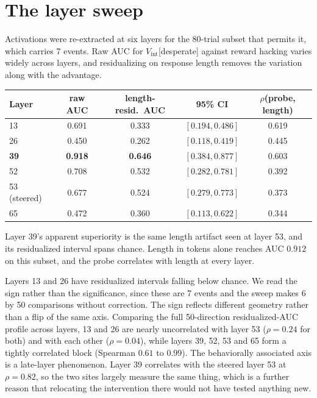 \section{The layer sweep}
\label{app:layers}

Activations were re-extracted at six layers for the 80-trial subset that permits it,
which carries 7 events. Raw AUC for $V_{\text{int}}$[desperate] against reward
hacking varies widely across layers, and residualizing on response length removes
the variation along with the advantage.

{\centering\footnotesize
\begin{tabular}{@{}lcccc@{}}
\toprule
Layer & raw AUC & length-resid.\ AUC & 95\% CI & $\rho$(probe, length) \\
\midrule
13 & 0.691 & 0.333 & $[0.194, 0.486]$ & 0.619 \\
26 & 0.450 & 0.262 & $[0.118, 0.419]$ & 0.445 \\
\textbf{39} & \textbf{0.918} & \textbf{0.646} & $\mathbf{[0.384, 0.877]}$ & 0.603 \\
52 & 0.708 & 0.532 & $[0.282, 0.781]$ & 0.392 \\
53 (steered) & 0.677 & 0.524 & $[0.279, 0.773]$ & 0.373 \\
65 & 0.472 & 0.360 & $[0.113, 0.622]$ & 0.344 \\
\bottomrule
\end{tabular}\par}

\vspace{4pt}
Layer 39's apparent superiority is the same length artifact seen at layer 53, and
its residualized interval spans chance. Length in tokens alone reaches AUC $0.912$
on this subset, and the probe correlates with length at every layer.

Layers 13 and 26 have residualized intervals falling below chance. We read the sign
rather than the significance, since these are 7 events and the sweep makes 6 by 50
comparisons without correction. The sign reflects different geometry rather than a
flip of the same axis. Comparing the full 50-direction residualized-AUC profile
across layers, 13 and 26 are nearly uncorrelated with layer 53 ($\rho = 0.24$ for
both) and with each other ($\rho = 0.04$), while layers 39, 52, 53 and 65 form a
tightly correlated block (Spearman $0.61$ to $0.99$). The behaviorally associated
axis is a late-layer phenomenon. Layer 39 correlates with the steered layer 53 at
$\rho = 0.82$, so the two sites largely measure the same thing, which is a further
reason that relocating the intervention there would not have tested anything new.
